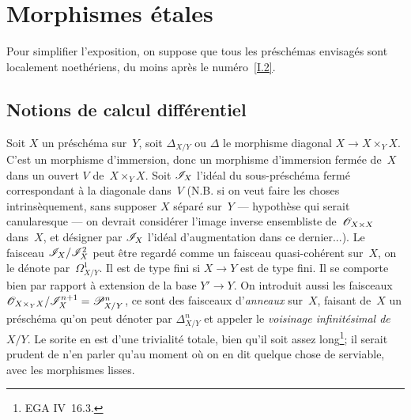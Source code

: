 \chapter{Morphismes \'etales}
\label{I}



Pour simplifier l'exposition, on suppose que tous les
pr\'esch\'emas envisag\'es sont localement noeth\'eriens, du
moins apr\`es le num\'ero~\ref{I.2}.

\section{Notions de calcul diff\'erentiel}
\label{I.1}
Soit $X$ un pr\'esch\'ema sur~$Y$, soit $\Delta_{X/Y}$ ou $\Delta$
\label{indnot:ab}le morphisme diagonal $X\to X\times_Y X$. C'est un morphisme
d'immersion, donc un morphisme d'immersion ferm\'ee de~$X$ dans un
ouvert $V$ de~$X\times_Y X$. Soit $\cal{I}_X$ l'id\'eal du
sous-pr\'esch\'ema ferm\'e correspondant \`a la diagonale
dans~$V$ (N.B. si on veut faire les choses intrins\`equement, sans
supposer $X$ s\'epar\'e sur~$Y$ --- hypoth\`ese qui serait
canularesque --- on devrait consid\'erer l'image inverse ensembliste
de~$\cal{O}_{X\times X}$ dans~$X$, et d\'esigner par $\cal{I}_X$
l'id\'eal d'augmentation dans ce dernier...). Le faisceau
$\cal{I}_X/\cal{I}_X^2$ peut \^etre regard\'e comme un faisceau
quasi-coh\'erent sur~$X$, on le d\'enote
par~$\mathit{\Omega}^1_{X/Y}$.
\label{indnot:ac}Il est de type fini si $X\to Y$ est de type fini. Il se comporte bien
par rapport \`a extension de la base $Y'\to Y$. On introduit aussi
les faisceaux $\cal{O}_{X\times_Y X}/\cal{I}_X^{n+1}=\cal{P}^n_{X/Y}$,
\label{indnot:ad}ce sont des faisceaux d'\emph{anneaux} sur~$X$, faisant de~$X$ un
pr\'esch\'ema qu'on peut d\'enoter par $\Delta_{X/Y}^n$
\label{indnot:ae}et appeler le \emph{\nieme voisinage infinitésimal de}~$X/Y$.
Le sorite en est d'une trivialit\'e totale, bien qu'il soit assez
long\footnote{\cf EGA IV~16.3.}; il serait prudent de n'en parler
qu'au moment o\`u on en dit quelque chose de serviable, avec les
morphismes lisses.

